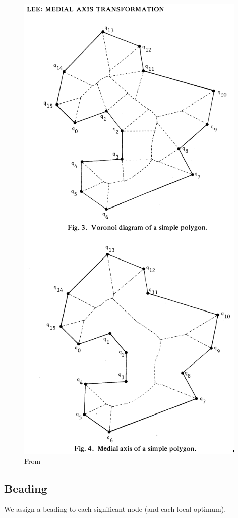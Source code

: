 \begin{figure}
\centering
\includegraphics[width=.8\columnwidth]{sources/method/voronoi_MAT.png}
\caption{From \citeauthor{lee1982medial} \cite{lee1982medial}}
\label{voronoi_MAT}
\end{figure}



\subsection{Beading}
We assign a beading to each significant node (and each local optimum).

